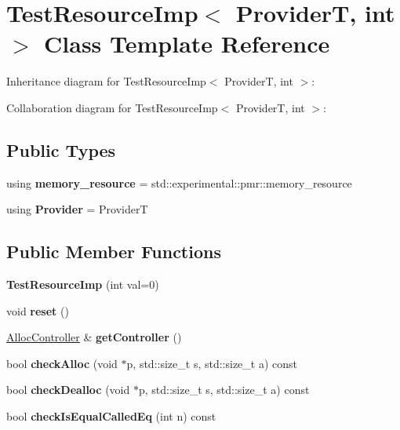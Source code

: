 \hypertarget{class_test_resource_imp}{}\section{Test\+Resource\+Imp$<$ ProviderT, int $>$ Class Template Reference}
\label{class_test_resource_imp}


Inheritance diagram for Test\+Resource\+Imp$<$ ProviderT, int $>$\+:


Collaboration diagram for Test\+Resource\+Imp$<$ ProviderT, int $>$\+:
\subsection*{Public Types}
\begin{DoxyCompactItemize}
\item 
\mbox{\label{class_test_resource_imp_a2aa425f6fcb88e29583406ab272c64a0}} 
using {\bfseries memory\+\_\+resource} = std\+::experimental\+::pmr\+::memory\+\_\+resource
\item 
\mbox{\label{class_test_resource_imp_a09bd3a2a4464a0b80858ffedcbeb9939}} 
using {\bfseries Provider} = ProviderT
\end{DoxyCompactItemize}
\subsection*{Public Member Functions}
\begin{DoxyCompactItemize}
\item 
\mbox{\label{class_test_resource_imp_a2a318e0436ec44c564b4ff794a9db45f}} 
{\bfseries Test\+Resource\+Imp} (int val=0)
\item 
\mbox{\label{class_test_resource_imp_a56d1fc5e9b6ca4952b738ba25ca950bf}} 
void {\bfseries reset} ()
\item 
\mbox{\label{class_test_resource_imp_a3589cc73c2afe155488f27bb07fc8449}} 
\mbox{\hyperlink{struct_alloc_controller}{Alloc\+Controller}} \& {\bfseries get\+Controller} ()
\item 
\mbox{\label{class_test_resource_imp_ac67af5ec981b9b29558cb67c9af8764c}} 
bool {\bfseries check\+Alloc} (void $\ast$p, std\+::size\+\_\+t s, std\+::size\+\_\+t a) const
\item 
\mbox{\label{class_test_resource_imp_a63d1382d308bab9fddc720efa3abbb98}} 
bool {\bfseries check\+Dealloc} (void $\ast$p, std\+::size\+\_\+t s, std\+::size\+\_\+t a) const
\item 
\mbox{\label{class_test_resource_imp_a83634fb6a24a38d2543859984c9eb76c}} 
bool {\bfseries check\+Is\+Equal\+Called\+Eq} (int n) const
\end{DoxyCompactItemize}
